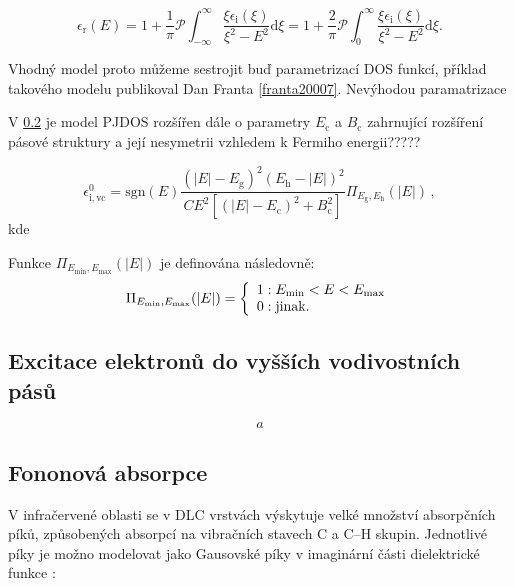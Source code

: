 \begin{equation}
\epsilon_\mathrm{r}(E) = 
1 + \frac{1}{\pi} \mathcal{P} \int_{-\infty}^\infty \frac{\xi \epsilon_\mathrm{i}(\xi)}{\xi^2 - E^2} \mathrm{d}\xi = 
1 + \frac{2}{\pi} \mathcal{P} \int_0^\infty \frac{\xi \epsilon_\mathrm{i}(\xi)}{\xi^2 - E^2} \mathrm{d}\xi 
\text{.}
\end{equation}


Vhodný model proto můžeme sestrojit buď parametrizací DOS funkcí, příklad takového modelu publikoval Dan Franta \ref{franta20007}. Nevýhodou paramatrizace     

V \ref{} je model PJDOS rozšířen dále o parametry $E_\mathrm{c}$ a $B_\mathrm{c}$ zahrnující rozšíření pásové struktury a její nesymetrii vzhledem k Fermiho energii?????

\begin{equation}
\label{valencvod}
\epsilon_\mathrm{i,vc}^0 = \mathrm{sgn}(E) \frac{(|E|- E_\mathrm{g})^2(E_\mathrm{h} - |E|)^2}{ C E^2 [(|E| - E_\mathrm{c})^2 + B_\mathrm{c}^2]} \Pi_{E_\mathrm{g},E_\mathrm{h}}(|E|) \, \mathrm{,}
\end{equation}
kde 

Funkce $\Pi_{E_\mathrm{min},E_\mathrm{max}}(|E|)$ je definována následovně:
\begin{equation}
\Pi_{E_\mathrm{min},E_\mathrm{max}}(|E|) = 
	\left\{\begin{array}{l l} 
	1 : E_\mathrm{min} < E < E_\mathrm{max} \\
	0 : \text{jinak.} \end{array} \right.
\end{equation}

\subsection{Excitace elektronů do vyšších vodivostních pásů}
\begin{equation}
a
\end{equation}


\subsection{Fononová absorpce}
V infračervené oblasti se v DLC vrstvách výskytuje velké množství absorpčních píků, způsobených absorpcí na vibračních stavech C a C--H skupin. Jednotlivé píky je možno modelovat jako Gausovské píky v imaginární části dielektrické funkce \cite{franta2007}:

